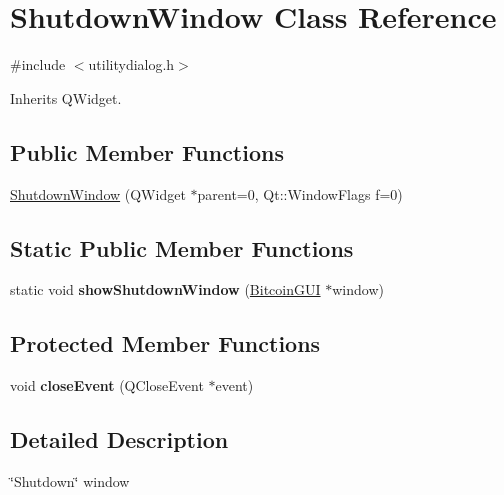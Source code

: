 \hypertarget{class_shutdown_window}{}\section{Shutdown\+Window Class Reference}
\label{class_shutdown_window}


{\ttfamily \#include $<$utilitydialog.\+h$>$}



Inherits Q\+Widget.

\subsection*{Public Member Functions}
\begin{DoxyCompactItemize}
\item 
\mbox{\hyperlink{class_shutdown_window_a9bf9b087649914f963f37a1ea235c969}{Shutdown\+Window}} (Q\+Widget $\ast$parent=0, Qt\+::\+Window\+Flags f=0)
\end{DoxyCompactItemize}
\subsection*{Static Public Member Functions}
\begin{DoxyCompactItemize}
\item 
\mbox{\label{class_shutdown_window_ad53d08169d8d97a58d72cc343502fd23}} 
static void {\bfseries show\+Shutdown\+Window} (\mbox{\hyperlink{class_bitcoin_g_u_i}{Bitcoin\+G\+UI}} $\ast$window)
\end{DoxyCompactItemize}
\subsection*{Protected Member Functions}
\begin{DoxyCompactItemize}
\item 
\mbox{\label{class_shutdown_window_aa0ad00e74fefcdb13a4c5bc3267ae285}} 
void {\bfseries close\+Event} (Q\+Close\+Event $\ast$event)
\end{DoxyCompactItemize}


\subsection{Detailed Description}
\char`\"{}\+Shutdown\char`\"{} window 

